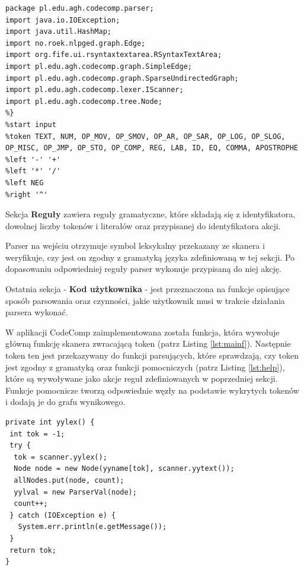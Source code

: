 \documentclass[a4paper,12pt,twoside]{article}
\begin{document}
\begin{lstlisting}[caption={Sekcja deklaracji analizatora składniowego w programie CodeComp.}, label={lst:dec}]
%{
package pl.edu.agh.codecomp.parser;
import java.io.IOException;
import java.util.HashMap;
import no.roek.nlpged.graph.Edge;
import org.fife.ui.rsyntaxtextarea.RSyntaxTextArea;
import pl.edu.agh.codecomp.graph.SimpleEdge;
import pl.edu.agh.codecomp.graph.SparseUndirectedGraph;
import pl.edu.agh.codecomp.lexer.IScanner;
import pl.edu.agh.codecomp.tree.Node;
%}
%start input 
%token TEXT, NUM, OP_MOV, OP_SMOV, OP_AR, OP_SAR, OP_LOG, OP_SLOG, OP_MISC, OP_JMP, OP_STO, OP_COMP, REG, LAB, ID, EQ, COMMA, APOSTROPHE
%left '-' '+'
%left '*' '/'
%left NEG
%right '^'
\end{lstlisting}

Sekcja \textbf{Reguły} zawiera reguły gramatyczne, które składają się z identyfikatora, dowolnej liczby tokenów i literałów oraz przypisanej do identyfikatora akcji.

Parser na wejściu otrzymuje symbol leksykalny przekazany ze skanera i weryfikuje, czy jest on zgodny z gramatyką języka zdefiniowaną w tej sekcji. Po dopasowaniu odpowiedniej reguły parser wykonuje przypisaną do niej akcję.


Ostatnia sekcja - \textbf{Kod użytkownika} - jest przeznaczona na funkcje opisujące sposób parsowania oraz czynności, jakie użytkownik musi w trakcie działania parsera wykonać.

W aplikacji CodeComp zaimplementowana została funkcja, która wywołuje główną funkcję skanera zwracającą token (patrz Listing \ref{lst:mainf}). Następnie token ten jest przekazywany do funkcji parsujących, które sprawdzają, czy token jest zgodny z gramatyką oraz funkcji pomocniczych (patrz Listing \ref{lst:help}), które są wywoływane jako akcje reguł zdefiniowanych w poprzedniej sekcji. Funkcje pomocnicze tworzą odpowiednie węzły na podstawie wykrytych tokenów i dodają je do grafu wynikowego.

\begin{lstlisting}[caption={Główna funkcja parsera.}, label={lst:mainf}]
private int yylex() {
 int tok = -1;
 try {
  tok = scanner.yylex();		
  Node node = new Node(yyname[tok], scanner.yytext());
  allNodes.put(node, count);
  yylval = new ParserVal(node);
  count++;
 } catch (IOException e) {
   System.err.println(e.getMessage());
 }
 return tok;
}
\end{lstlisting}
\\ \\
\end{document}
